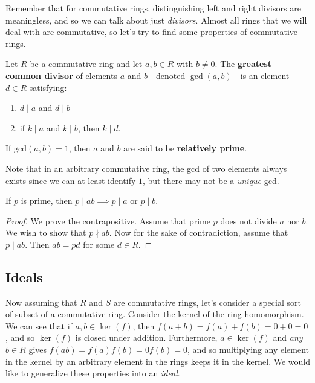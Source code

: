   Remember that for commutative rings, distinguishing left and right divisors are meaningless, and so we can talk about just \textit{divisors}. Almost all rings that we will deal with are commutative, so let's try to find some properties of commutative rings.  

  \begin{definition}
    Let $R$ be a commutative ring and let $a, b \in R$ with $b \neq 0$. The \textbf{greatest common divisor} of elements $a$ and $b$---denoted $\gcd(a, b)$---is an element $d \in R$ satisfying: 
    \begin{enumerate}
      \item $d \mid a$ and $d \mid b$ 
      \item if $k \mid a$ and $k \mid b$, then $k \mid d$. 
    \end{enumerate}
    If $\mathrm{gcd}(a, b) = 1$, then $a$ and $b$ are said to be \textbf{relatively prime}. 
  \end{definition} 

  Note that in an arbitrary commutative ring, the gcd of two elements always exists since we can at least identify $1$, but there may not be a \textit{unique} gcd. 

  \begin{lemma}
    If $p$ is prime, then $p \mid ab \implies p \mid a$ or $p \mid b$.  
  \end{lemma}
  \begin{proof}
    We prove the contrapositive. Assume that prime $p$ does not divide $a$ nor $b$. We wish to show that $p \nmid ab$. Now for the sake of contradiction, assume that $p \mid ab$. Then $ab = pd$ for some $d \in R$. 
  \end{proof}

\subsection{Ideals}

  Now assuming that $R$ and $S$ are commutative rings, let's consider a special sort of subset of a commutative ring. Consider the kernel of the ring homomorphism. We can see that if $a, b \in \ker(f)$, then $f(a + b) = f(a) + f(b) = 0 + 0 = 0$, and so $\ker(f)$ is closed under addition. Furthermore, $a \in \ker(f)$ and \textit{any} $b \in R$ gives $f(ab) = f(a) f(b) = 0 f(b) = 0$, and so multiplying any element in the kernel by an arbitrary element in the rings keeps it in the kernel. We would like to generalize these properties into an \textit{ideal}. 

